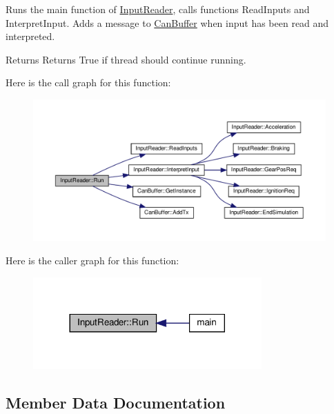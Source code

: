 Runs the main function of \hyperlink{classInputReader}{Input\+Reader}, calls functions Read\+Inputs and Interpret\+Input. Adds a message to \hyperlink{classCanBuffer}{Can\+Buffer} when input has been read and interpreted. \begin{DoxyReturn}{Returns}
Returns True if thread should continue running. 
\end{DoxyReturn}
Here is the call graph for this function\+:
\nopagebreak
\begin{figure}[H]
\begin{center}
\leavevmode
\includegraphics[width=350pt]{classInputReader_a258e1e58806e172a4339bb2aec9a85f0_cgraph}
\end{center}
\end{figure}
Here is the caller graph for this function\+:
\nopagebreak
\begin{figure}[H]
\begin{center}
\leavevmode
\includegraphics[width=248pt]{classInputReader_a258e1e58806e172a4339bb2aec9a85f0_icgraph}
\end{center}
\end{figure}


\subsection{Member Data Documentation}
\mbox{\label{classInputReader_ac8b258254da835100455ef83dd3921df}} 
